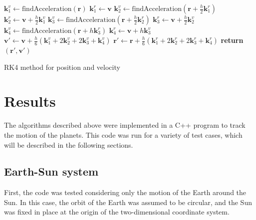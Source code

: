 \documentclass[aps,prc,reprint,nobalancelastpage]{revtex4-1}
\begin{document}
            \begin{algorithm}[H]
                \begin{algorithmic}
                        \State $\mathbf{k}_1^v \gets \text{findAcceleration}(\mathbf{r})$
                        \State $\mathbf{k}_1^r \gets \mathbf{v}$
                        \State $\mathbf{k}_2^v \gets \text{findAcceleration}(\mathbf{r} + \frac{h}{2}\mathbf{k}_1^r)$
                        \State $\mathbf{k}_2^r \gets \mathbf{v} + \frac{h}{2} \mathbf{k}_1^v$
                        \State $\mathbf{k}_3^v \gets \text{findAcceleration}(\mathbf{r} + \frac{h}{2}\mathbf{k}_2^r)$
                        \State $\mathbf{k}_3^r \gets \mathbf{v} + \frac{h}{2} \mathbf{k}_2^v$
                        \State $\mathbf{k}_4^v \gets \text{findAcceleration}(\mathbf{r} + h\mathbf{k}_3^r)$
                        \State $\mathbf{k}_4^r \gets \mathbf{v} + h \mathbf{k}_3^v$
                        \State $\mathbf{v}' \gets \mathbf{v} + \frac{h}{6} (\mathbf{k}_1^v + 2\mathbf{k}_2^v + 2\mathbf{k}_3^v + \mathbf{k}_4^v)$
                        \State $\mathbf{r}' \gets \mathbf{r} + \frac{h}{6} (\mathbf{k}_1^r + 2\mathbf{k}_2^r + 2\mathbf{k}_3^r + \mathbf{k}_4^r)$
                        \State \textbf{return} $(\mathbf{r}', \mathbf{v}')$
                    \EndFunction
                \end{algorithmic}
                \caption{RK4 method for position and velocity}
            \end{algorithm}

\section{Results}
\label{sec:results}

    The algorithms described above were implemented in a C++ program to track the motion of the planets. This code was run for a variety of test cases, which will be described in the following sections.

    \subsection{Earth-Sun system}
    \label{sub:earthsun}

        First, the code was tested considering only the motion of the Earth around the Sun. In this case, the orbit of the Earth was assumed to be circular, and the Sun was fixed in place at the origin of the two-dimensional coordinate system.
\end{document}
